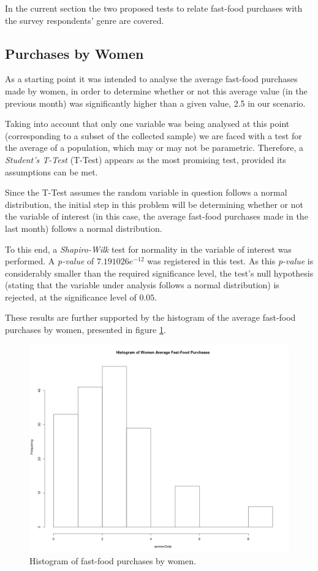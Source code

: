 \documentclass[12pt]{article}
\begin{document}
In the current section the two proposed tests to relate fast-food purchases with the survey respondents' genre are covered.

\subsection{Purchases by Women}

As a starting point it was intended to analyse the average fast-food purchases made by women, in order to determine whether or not this average value (in the previous month) was significantly higher than a given value, 2.5 in our scenario.

Taking into account that only one variable was being analysed at this point (corresponding to a subset of the collected sample) we are faced with a test for the average of a population, which may or may not be parametric. Therefore, a \emph{Student's T-Test} (T-Test) appears as the most promising test, provided its assumptions can be met.

Since the T-Test assumes the random variable in question follows a normal distribution, the initial step in this problem will be determining whether or not the variable of interest (in this case, the average fast-food purchases made in the last month) follows a normal distribution.

To this end, a \emph{Shapiro-Wilk} test for normality in the variable of interest was performed. A \emph{p-value} of $7.191026e^{-12}$ was registered in this test. As this \emph{p-value} is considerably smaller than the required significance level, the test's null hypothesis (stating that the variable under analysis follows a normal distribution) is rejected, at the significance level of $0.05$.

These results are further supported by the histogram of the average fast-food purchases by women, presented in figure \ref{histogram_women_purchases}.

\begin{figure}[H]
	\centering
	\includegraphics[scale=0.28]{images/Histogram_WomenData.png}
	\caption{Histogram of fast-food purchases by women.}
	\label{histogram_women_purchases}
\end{figure}
\end{document}
